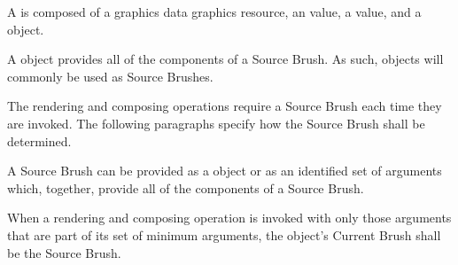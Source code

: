 \pnum
A  is composed of a graphics data graphics resource, an  value, a  value, and a  object.

\pnum
A  object provides all of the components of a Source Brush. As such,  objects will commonly be used as Source Brushes.

\pnum
The rendering and composing operations require a Source Brush each time they are invoked. The following paragraphs specify how the Source Brush shall be determined.

\pnum
A Source Brush can be provided as a  object or as an identified set of arguments which, together, provide all of the components of a Source Brush.

\pnum
When a rendering and composing operation is invoked with only those arguments that are part of its set of minimum arguments, the  object's Current Brush shall be the Source Brush.

